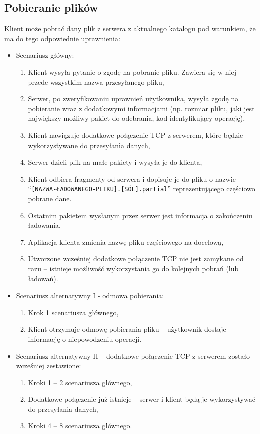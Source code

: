 \documentclass[10pt,a4paper]{article}
\newcommand{\quotes}[1]{``#1''}
\begin{document}
\subsection{Pobieranie plików}
\noindent Klient może pobrać dany plik z serwera z aktualnego katalogu pod warunkiem, że ma do tego odpowiednie uprawnienia:
\begin{itemize}
    \item Scenariusz główny:
    \begin{enumerate}
        \item Klient wysyła pytanie o zgodę na pobranie pliku. Zawiera się w niej przede wszystkim nazwa przesyłanego pliku,
        \item Serwer, po zweryfikowaniu uprawnień użytkownika, wysyła zgodę na pobieranie wraz z dodatkowymi informacjami (np. rozmiar pliku, jaki jest największy możliwy pakiet do odebrania, kod identyfikujący operację),
        \item Klient nawiązuje dodatkowe połączenie TCP z serwerem, które będzie wykorzystywane do przesyłania danych,
        \item Serwer dzieli plik na małe pakiety i wysyła je do klienta,
        \item Klient odbiera fragmenty od serwera i dopisuje je do pliku o nazwie \quotes{\texttt{[NAZWA-ŁADOWANEGO-PLIKU].[SÓL].partial}} reprezentującego częściowo pobrane dane.
        \item Ostatnim pakietem wysłanym przez serwer jest informacja o zakończeniu ładowania,
        \item Aplikacja klienta zmienia nazwę pliku częściowego na docelową,
        \item Utworzone wcześniej dodatkowe połączenie TCP nie jest zamykane od razu -- istnieje możliwość wykorzystania go do kolejnych pobrań (lub ładowań).
    \end{enumerate}

    \item Scenariusz alternatywny I - odmowa pobierania:
    \begin{enumerate}
        \item Krok 1 scenariusza głównego,
        \item Klient otrzymuje odmowę pobierania pliku -- użytkownik dostaje informację o niepowodzeniu operacji.
    \end{enumerate}

    \item Scenariusz alternatywny II -- dodatkowe połączenie TCP z serwerem zostało wcześniej zestawione:
    \begin{enumerate}
        \item Kroki 1 -- 2 scenariusza głównego,
        \item Dodatkowe połączenie już istnieje -- serwer i klient będą je wykorzystywać do przesyłania danych,
        \item Kroki 4 -- 8 scenariusza głównego.
    \end{enumerate}


\end{itemize}
\end{document}
